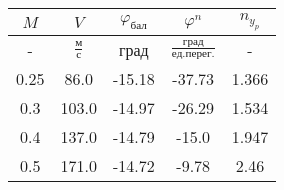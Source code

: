 \begin{tabular}{|c|c|c|c|c|}
\hline
$M$ & $V$ & $\varphi_{бал}$ & $\varphi^{n}$ & $n_{y_{p}}$ \\ 
\hline
- & $\frac{м}{с}$ & град & $\frac{град}{ед.перег.}$ & - \\ 
\hline
0.25 & 86.0 & -15.18 & -37.73 & 1.366 \\ 
\hline
0.3 & 103.0 & -14.97 & -26.29 & 1.534 \\ 
\hline
0.4 & 137.0 & -14.79 & -15.0 & 1.947 \\ 
\hline
0.5 & 171.0 & -14.72 & -9.78 & 2.46 \\ 
\hline
\end{tabular}
